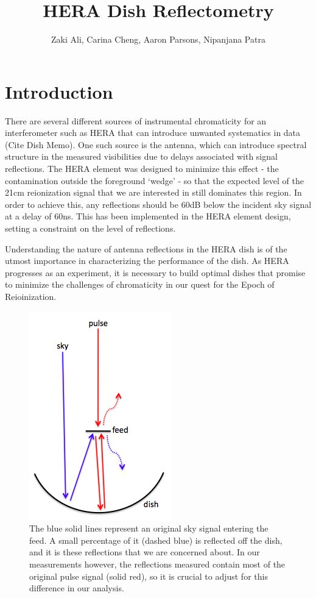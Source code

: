 \documentclass[12pt,preprint]{aastex}
\begin{document}
\title{HERA Dish Reflectometry} 
\author{Zaki Ali, Carina Cheng, Aaron Parsons, Nipanjana Patra}
\maketitle

\section{Introduction}

There are several different sources of instrumental chromaticity for an
interferometer such as HERA that can introduce unwanted systematics in data
(Cite Dish Memo). One such source is the antenna, which can introduce
spectral structure in the measured visibilities due to delays associated with
signal reflections.  The HERA element was designed to minimize this effect -
the contamination outside the foreground `wedge' - so that the expected level
of the 21cm reionization signal that we are interested in still dominates this
region. In order to achieve this, any reflections should be 60dB below the
incident sky signal  at a delay of 60ns. This has been implemented in the HERA
element design, setting a constraint on the level of reflections. 

Understanding the nature of antenna reflections in the HERA dish is of the
utmost importance in characterizing the performance of the dish. As HERA
progresses as an experiment, it is necessary to build optimal dishes that
promise to minimize the challenges of chromaticity in our quest for the Epoch
of Reioinization.

\begin{figure}
\centering
\includegraphics[totalheight=0.3\textheight]{plots/reflection_cartoon.png}
\caption{The blue solid lines represent an original sky signal entering the feed. A small percentage of it (dashed blue) is reflected off the dish, and it is these reflections that we are concerned about. In our measurements however, the reflections measured contain most of the original pulse signal (solid red), so it is crucial to adjust for this difference in our analysis.}
\label{fig:cartoon}
\end{figure}
\end{document}
